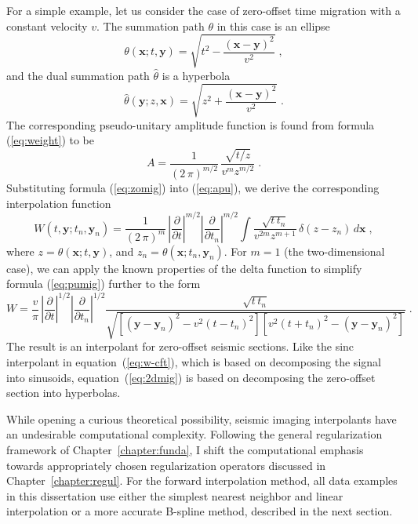 For a simple example, let us consider the case of zero-offset time
migration with a constant velocity $v$. The summation path $\theta$
in this case is an ellipse
\begin{equation}
  \label{eq:ellips}
  \theta(\mathbf{x};t,\mathbf{y}) = \sqrt{t^2 -
    \frac{(\mathbf{x}-\mathbf{y})^2}{v^2}}\;,
\end{equation}
and the dual summation path $\widehat{\theta}$ is a hyperbola
\begin{equation}
  \label{eq:hyper}
  \widehat{\theta}(\mathbf{y};z,\mathbf{x}) = \sqrt{z^2 +
    \frac{(\mathbf{x}-\mathbf{y})^2}{v^2}}\;.
\end{equation}
The corresponding pseudo-unitary amplitude function is found from
formula (\ref{eq:weight}) to be \cite[]{Fomel.sep.92.267}
\begin{equation}
  \label{eq:zomig}
  A = \frac{1}{\left(2\,\pi\right)^{m/2}} \,
\frac{\sqrt{t/z}}{v^m z^{m/2}}\;.
\end{equation}
Substituting formula (\ref{eq:zomig}) into (\ref{eq:apu}), we derive
the corresponding interpolation function
\begin{equation}
  \label{eq:pumig}
  W (t, \mathbf{y}; t_n, \mathbf{y}_n)
  = \frac{1}{\left(2\,\pi\right)^{m}} \,
  \left|\frac{\partial}{\partial t}\right|^{m/2}
  \left|\frac{\partial}{\partial t_n}\right|^{m/2} \int
  \frac{\sqrt{t\,t_n}}{v^{2m} z^{m+1}}\,
  \delta (z - z_n) \,d \mathbf{x}\;,
\end{equation}
where $z = \theta(\mathbf{x};t,\mathbf{y})$, and $z_n =
\theta(\mathbf{x};t_n,\mathbf{y}_n)$. For $m=1$ (the two-dimensional
case), we can apply the known properties of the delta function to
simplify formula (\ref{eq:pumig}) further to the form
\begin{equation}
  \label{eq:2dmig}
  W
  = \frac{v}{\pi} \,
  \left|\frac{\partial}{\partial t}\right|^{1/2}
  \left|\frac{\partial}{\partial t_n}\right|^{1/2}
  \frac{\sqrt{t\,t_n}}{\sqrt{
      \left[(\mathbf{y}-\mathbf{y}_n)^2 - v^2 (t - t_n)^2\right]
      \left[v^2 (t + t_n)^2 - (\mathbf{y}-\mathbf{y}_n)^2\right]
      }}\;.
\end{equation}
The result is an interpolant for zero-offset seismic sections.  Like
the sinc interpolant in equation~(\ref{eq:w-cft}), which is based on
decomposing the signal into sinusoids, equation~(\ref{eq:2dmig}) is
based on decomposing the zero-offset section into hyperbolas. 

While opening a curious theoretical possibility, seismic imaging
interpolants have an undesirable computational complexity. Following
the general regularization framework of Chapter~\ref{chapter:funda}, I
shift the computational emphasis towards appropriately chosen
regularization operators discussed in Chapter~\ref{chapter:regul}.
For the forward interpolation method, all data examples in this
dissertation use either the simplest nearest neighbor and linear
interpolation or a more accurate B-spline method, described in the
next section.

